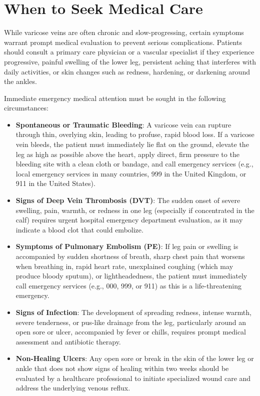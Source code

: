 \section*{When to Seek Medical Care}
While varicose veins are often chronic and slow-progressing, certain symptoms warrant prompt medical evaluation to prevent serious complications. Patients should consult a primary care physician or a vascular specialist if they experience progressive, painful swelling of the lower leg, persistent aching that interferes with daily activities, or skin changes such as redness, hardening, or darkening around the ankles.

Immediate emergency medical attention must be sought in the following circumstances:
\begin{itemize}
\item \textbf{Spontaneous or Traumatic Bleeding}: A varicose vein can rupture through thin, overlying skin, leading to profuse, rapid blood loss. If a varicose vein bleeds, the patient must immediately lie flat on the ground, elevate the leg as high as possible above the heart, apply direct, firm pressure to the bleeding site with a clean cloth or bandage, and call emergency services (e.g., local emergency services in many countries, 999 in the United Kingdom, or 911 in the United States).
\item \textbf{Signs of Deep Vein Thrombosis (DVT)}: The sudden onset of severe swelling, pain, warmth, or redness in one leg (especially if concentrated in the calf) requires urgent hospital emergency department evaluation, as it may indicate a blood clot that could embolize.
\item \textbf{Symptoms of Pulmonary Embolism (PE)}: If leg pain or swelling is accompanied by sudden shortness of breath, sharp chest pain that worsens when breathing in, rapid heart rate, unexplained coughing (which may produce bloody sputum), or lightheadedness, the patient must immediately call emergency services (e.g., 000, 999, or 911) as this is a life-threatening emergency.
\item \textbf{Signs of Infection}: The development of spreading redness, intense warmth, severe tenderness, or pus-like drainage from the leg, particularly around an open sore or ulcer, accompanied by fever or chills, requires prompt medical assessment and antibiotic therapy.
\item \textbf{Non-Healing Ulcers}: Any open sore or break in the skin of the lower leg or ankle that does not show signs of healing within two weeks should be evaluated by a healthcare professional to initiate specialized wound care and address the underlying venous reflux.
\end{itemize}

